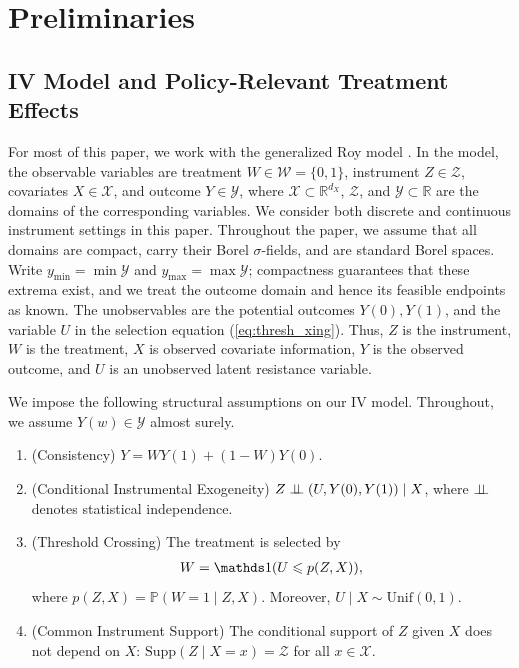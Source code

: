 ﻿\section{Preliminaries} \label{sec:pre}
\subsection{IV Model and Policy-Relevant Treatment Effects}\label{subsec:iv_prte}
For most of this paper, we work with the generalized Roy model \citep{heckman2005structural}. In the model, the observable variables are treatment $W\in \mathcal{W} = \{0,1\}$, instrument $Z \in \mathcal{Z}$, covariates $X\in\mathcal{X}$, and outcome $Y \in \mathcal{Y}$, where $\mathcal{X} \subset\mathbb{R}^{d_X}$, $\mathcal{Z}$, and $\mathcal{Y} \subset \mathbb{R}$ are the domains of the corresponding variables. We consider both discrete and continuous instrument settings in this paper. Throughout the paper, we assume that all domains are compact, carry their Borel $\sigma$-fields, and are standard Borel spaces. Write $y_{\min}=\min\mathcal Y$ and $y_{\max}=\max\mathcal Y$; compactness guarantees that these extrema exist, and we treat the outcome domain and hence its feasible endpoints as known. The unobservables are the potential outcomes $Y(0), Y(1)$, and the variable $U$ in the selection equation (\ref{eq:thresh_xing}). Thus, $Z$ is the instrument, $W$ is the treatment, $X$ is observed covariate information, $Y$ is the observed outcome, and $U$ is an unobserved latent resistance variable.
\begin{assumption} \label{asp:structure}
    We impose the following structural assumptions on our IV model. Throughout, we assume $Y(w) \in \mathcal{Y}$ almost surely.
    \begin{enumerate}
        \item (Consistency) $Y = WY(1) + (1-W)Y(0)$.
        \item (Conditional Instrumental Exogeneity) $Z \perp\!\!\!\perp (U,Y(0),Y(1)) \mid X$, where $\perp\!\!\!\perp$ denotes statistical independence.
        \item (Threshold Crossing) The treatment is selected by
        \begin{align}\label{eq:thresh_xing}
            W = \indicator (U\leqslant p(Z,X)),
        \end{align}
        where $p(Z,X) = \mathbb{P}(W=1 \mid Z, X)$. Moreover, $U \mid X \sim \mathrm{Unif}(0,1)$.
        \item (Common Instrument Support) The conditional support of $Z$ given $X$ does not depend on $X$: $\mathrm{Supp}(Z \mid X=x) = \mathcal{Z}$ for all $x \in \mathcal{X}$.
    \end{enumerate}
\end{assumption}

